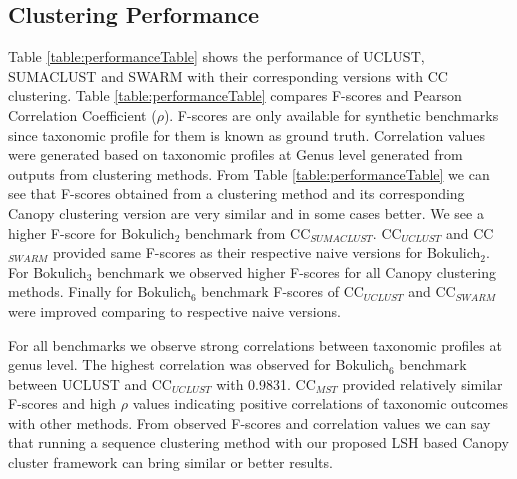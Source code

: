 \documentclass[10pt, conference, compsocconf]{IEEEtran}
\begin{document}
\subsection{\textbf{Clustering Performance}}
Table \ref{table:performanceTable} shows the performance of  UCLUST, SUMACLUST and SWARM with their corresponding versions with CC clustering. Table \ref{table:performanceTable} compares F-scores and Pearson Correlation Coefficient ($\rho$). F-scores are only available for synthetic benchmarks since taxonomic profile for them is known as ground truth. Correlation values were generated based on taxonomic profiles at Genus level generated from outputs from clustering methods. From Table \ref{table:performanceTable} we can see that F-scores obtained from a clustering method and its corresponding Canopy clustering version are very similar and in some cases better. We see a higher F-score for Bokulich$_2$ benchmark from CC$_{SUMACLUST}$. CC$_{UCLUST}$ and CC$_{SWARM}$ provided same F-scores as their respective naive versions for Bokulich$_2$. For Bokulich$_3$ benchmark we observed higher F-scores for all Canopy clustering methods. Finally for Bokulich$_6$ benchmark F-scores of CC$_{UCLUST}$ and CC$_{SWARM}$ were improved comparing to respective naive versions.

For all benchmarks we observe strong correlations between taxonomic profiles at genus level. The highest correlation was observed for Bokulich$_6$ benchmark between UCLUST and CC$_{UCLUST}$ with 0.9831. CC$_{MST}$ provided relatively similar F-scores and high $\rho$ values indicating positive correlations of taxonomic outcomes with other methods. From observed F-scores and correlation values we can say that running a sequence clustering method with our proposed LSH based Canopy cluster framework can bring similar or better results.
\end{document}
